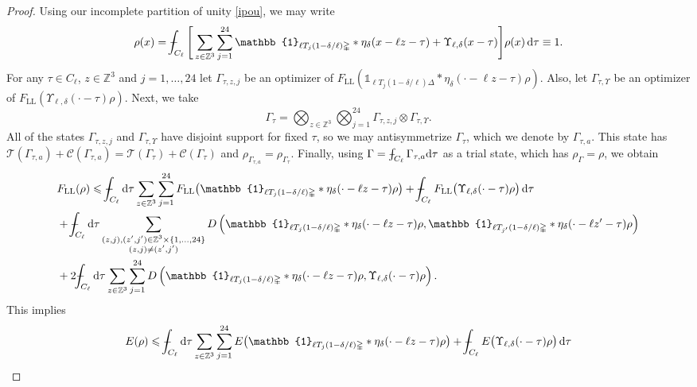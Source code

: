 \documentclass[final,onefignum,onetabnum,reqno]{amsart}
\theoremstyle{remark}
\renewcommand{\le}{\leqslant}
\newcommand{\ZZ}{\mathbb{Z}}
\newcommand{\LL}{\mathrm{LL}} %
\newcommand{\iden}{\mathbb{1}} %
\newcommand{\tetra}{\mathbb{\Delta}} %
\newcommand{\dd}{\mathrm{d}} %
\def\Xint#1{\mathchoice
{\XXint\displaystyle\textstyle{#1}}%
{\XXint\textstyle\scriptstyle{#1}}%
{\XXint\scriptstyle\scriptscriptstyle{#1}}%
{\XXint\scriptscriptstyle\scriptscriptstyle{#1}}%
\!\int}
\def\XXint#1#2#3{{\setbox0=\hbox{$#1{#2#3}{\int}$ }
\vcenter{\hbox{$#2#3$ }}\kern-.6\wd0}}
\def\dashint{\Xint-}
\newcommand{\TC}{\mathcal{T}}
\newcommand{\Cc}{\mathcal{C}}
\begin{document}
\begin{proof}
Using our incomplete partition of unity \cref{ipou}, we may write
\begin{equation}\label{pourho}
\rho(x)=\dashint_{C_\ell} \Bigg[ \sum_{z\in\ZZ^3} \sum_{j=1}^{24} \iden_{\ell T_j(1-\delta/\ell)\tetra} * \eta_\delta(x - \ell z - \tau) + \Upsilon_{\ell,\delta}(x-\tau)\Bigg]\rho(x)\,\dd\tau \equiv 1.
\end{equation}
For any $\tau\in C_{\ell}$, $z\in\ZZ^3$ and $j=1,\ldots,24$ let $\Gamma_{\tau,z,j}$ be an optimizer of $F_\LL(\iden_{\ell T_j(1-\delta/\ell)\tetra} * \eta_\delta(\cdot - \ell z - \tau)\rho)$.
Also, let $\Gamma_{\tau,\Upsilon}$ be an optimizer of $F_\LL(\Upsilon_{\ell,\delta}(\cdot-\tau)\rho)$.
Next, we take 
$$
\Gamma_\tau=\bigotimes_{z\in\ZZ^3} \bigotimes_{j=1}^{24} \Gamma_{\tau,z,j} \otimes \Gamma_{\tau,\Upsilon}.
$$
All of the states $\Gamma_{\tau,z,j}$ and $\Gamma_{\tau,\Upsilon}$ have disjoint support for fixed $\tau$, so we may antisymmetrize $\Gamma_\tau$, which we denote by $\Gamma_{\tau,a}$.
This state has $\TC(\Gamma_{\tau,a})+\Cc(\Gamma_{\tau,a})=\TC(\Gamma_\tau)+\Cc(\Gamma_\tau)$ and $\rho_{\Gamma_{\tau,a}}=\rho_{\Gamma_\tau}$. 
Finally, using $\Gamma=\dashint_{C_{\ell}}\Gamma_{\tau,a}\dd\tau$ as a trial state, which has $\rho_\Gamma=\rho$, we obtain
\begin{align*}
&F_\LL(\rho)\le \dashint_{C_{\ell}}\dd\tau \sum_{z\in\ZZ^3} \sum_{j=1}^{24} F_\LL\bigl(\iden_{\ell T_j(1-\delta/\ell)\tetra} * \eta_\delta(\cdot - \ell z - \tau)\rho\bigr)+\dashint_{C_{\ell}} F_\LL\bigl(\Upsilon_{\ell,\delta}(\cdot - \tau)\rho\bigr)\, \dd\tau\\
&+ \dashint_{C_{\ell}} \dd\tau \sum_{\substack{(z,j),(z',j')\in\ZZ^3\times\{1,\ldots,24\}\\(z,j)\neq(z',j')}} 
D\left(\iden_{\ell T_j(1-\delta/\ell)\tetra} * \eta_\delta(\cdot - \ell z - \tau)\rho, \iden_{\ell T_{j'}(1-\delta/\ell)\tetra} * \eta_\delta(\cdot - \ell z' - \tau)\rho\right)\\
&+ 2\dashint_{C_{\ell}} \dd\tau \sum_{z\in\ZZ^3} 
\sum_{j=1}^{24} D\left(\iden_{\ell T_j(1-\delta/\ell)\tetra} * \eta_\delta(\cdot - \ell z - \tau)\rho, \Upsilon_{\ell,\delta}(\cdot-\tau)\rho\right).
\end{align*}
This implies
\begin{align*}
&E(\rho)\le \dashint_{C_{\ell}}\dd\tau \sum_{z\in\ZZ^3} \sum_{j=1}^{24} E\bigl(\iden_{\ell T_j(1-\delta/\ell)\tetra} * \eta_\delta(\cdot - \ell z - \tau)\rho\bigr)+\dashint_{C_{\ell}} E\bigl(\Upsilon_{\ell,\delta}(\cdot - \tau)\rho\bigr)\, \dd\tau\\

\end{align*}
\end{proof}
\end{document}
